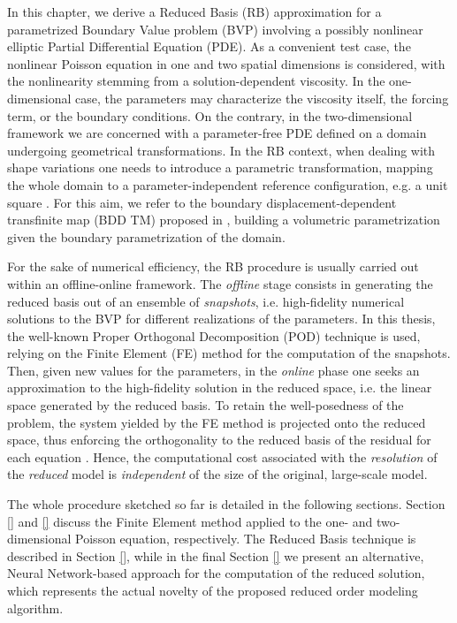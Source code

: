 \documentclass[11pt, a4paper]{report}
\theoremstyle{theorem}
\numberwithin{equation}{section}
\numberwithin{figure}{section}
\begin{document}
		In this chapter, we derive a Reduced Basis (RB) approximation for a parametrized Boundary Value problem (BVP) involving a possibly nonlinear elliptic Partial Differential Equation (PDE). As a convenient test case, the nonlinear Poisson equation in one and two spatial dimensions is considered, with the nonlinearity stemming from a solution-dependent viscosity. In the one-dimensional case, the parameters may characterize the viscosity itself, the forcing term, or the boundary conditions. On the contrary, in the two-dimensional framework we are concerned with a parameter-free PDE defined on a domain undergoing geometrical transformations. In the RB context, when dealing with shape variations one needs to introduce a parametric transformation, mapping the whole domain to a parameter-independent reference configuration, e.g. a unit square \cite{MN16}. For this aim, we refer to the boundary displacement-dependent transfinite map (BDD TM) proposed in \cite{JIR14}, building a volumetric parametrization given the boundary parametrization of the domain. 
		
		For the sake of numerical efficiency, the RB procedure is usually carried out within an offline-online framework. The \emph{offline} stage consists in generating the reduced basis out of an ensemble of \emph{snapshots}, i.e. high-fidelity numerical solutions to the BVP for different realizations of the parameters. In this thesis, the well-known Proper Orthogonal Decomposition (POD) technique is used, relying on the Finite Element (FE) method for the computation of the snapshots. Then, given new values for the parameters, in the \emph{online} phase one seeks an approximation to the high-fidelity solution in the reduced space, i.e. the linear space generated by the reduced basis. To retain the well-posedness of the problem, the system yielded by the FE method is projected onto the reduced space, thus enforcing the orthogonality to the reduced basis of the residual for each equation \cite{HRS15,MN16}. Hence, the computational cost associated with the \emph{resolution} of the \emph{reduced} model is \emph{independent} of the size of the original, large-scale model. 
		
		The whole procedure sketched so far is detailed in the following sections. Section \ref{} and \ref{} discuss the Finite Element method applied to the one- and two-dimensional Poisson equation, respectively. The Reduced Basis technique is described in Section \ref{}, while in the final Section \ref{} we present an alternative, Neural Network-based approach for the computation of the reduced solution, which represents the actual novelty of the proposed reduced order modeling algorithm.
		
\end{document}
